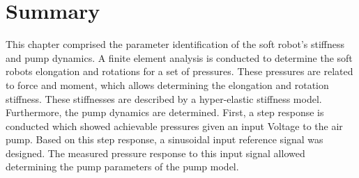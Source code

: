 \section*{Summary} 

This chapter comprised the parameter identification of the soft robot's stiffness and pump dynamics. A finite element analysis is conducted to determine the soft robots elongation and rotations for a set of pressures. These pressures are related to force and moment, which allows determining the elongation and rotation stiffness. These stiffnesses are described by a hyper-elastic stiffness model. Furthermore, the pump dynamics are determined. First, a step response is conducted which showed achievable pressures given an input Voltage to the air pump. Based on this step response, a sinusoidal input reference signal was designed. The measured pressure response to this input signal allowed determining the pump parameters of the pump model. 

